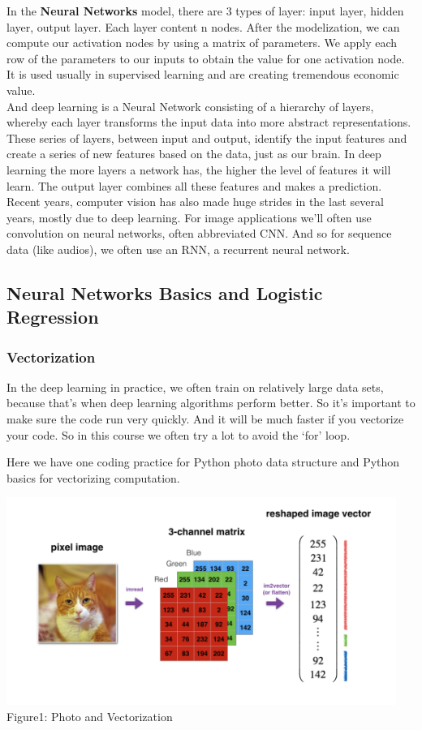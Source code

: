 \documentclass[a4paper]{article}
\begin{document}
In the \textbf{Neural Networks} model, there are 3 types of layer: input layer, hidden layer, output layer. Each layer content n nodes. After the modelization, we can compute our activation nodes by using a matrix of parameters. We apply each row of the parameters to our inputs to obtain the value for one activation node. It is used usually in  supervised learning and are creating tremendous economic value.\\

And deep learning is a Neural Network consisting of a hierarchy of layers, whereby each layer transforms the input data into more abstract representations. These series of layers, between input and output, identify the input features and create a series of new features based on the data, just as our brain. In deep learning the more layers a network has, the higher the level of features it will learn. The output layer combines all these features and makes a prediction.\\

Recent years, computer vision has also made huge strides in the last several years, mostly due to deep learning. For image applications we'll often use convolution on neural networks, often abbreviated CNN. And so for sequence data (like audios), we often use an RNN, a recurrent neural network.\\

\subsection{\textbf{Neural Networks Basics and Logistic Regression}}
\subsubsection{\textbf{Vectorization}}

In the deep learning in practice, we often train on relatively large data sets, because that's when deep learning algorithms perform better. So it's important to make sure the code run very quickly. And it will be much faster if you vectorize your code. So in this course we often try a lot to avoid the `for' loop.

Here we have one coding practice for Python photo data structure and Python basics for vectorizing computation.
\begin{center}
\includegraphics[width=5in]{vector.png}\\
Figure1: Photo and Vectorization
\end{center}
\end{document}

